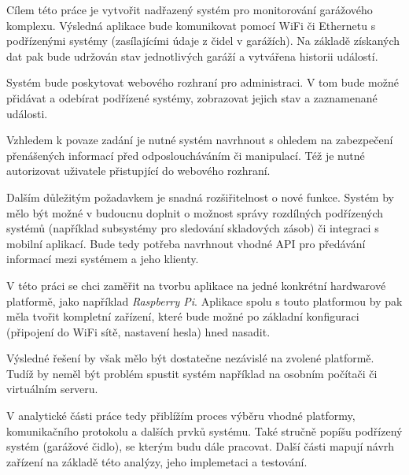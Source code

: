 Cílem této práce je vytvořit nadřazený systém pro monitorování garážového komplexu. Výsledná aplikace bude komunikovat pomocí WiFi či Ethernetu s podřízenými systémy (zasílajícími údaje z čidel v garážích). Na základě získaných dat pak bude udržován stav jednotlivých garáží a vytvářena historii událostí.

Systém bude poskytovat webového rozhraní pro administraci. V tom bude možné přidávat a odebírat podřízené systémy, zobrazovat jejich stav a zaznamenané události.

Vzhledem k povaze zadání je nutné systém navrhnout s ohledem na zabezpečení přenášených informací před odposloucháváním či manipulací. Též je nutné autorizovat uživatele přistupjící do webového rozhraní.

Dalším důležitým požadavkem je snadná rozšiřitelnost o nové funkce. Systém by mělo být možné v budoucnu doplnit o možnost správy rozdílných podřízených systémů (například subsystémy pro sledování skladových zásob) či integraci s mobilní aplikací. Bude tedy potřeba navrhnout vhodné API pro předávání informací mezi systémem a jeho klienty. 

V této práci se chci zaměřit na tvorbu aplikace na jedné konkrétní hardwarové platformě, jako například \textit{Raspberry Pi}. Aplikace spolu s touto platformou by pak měla tvořit kompletní zařízení, které bude možné po základní konfiguraci (připojení do WiFi sítě, nastavení hesla) hned nasadit.

Výsledné řešení by však mělo být dostatečne nezávislé na zvolené platformě. Tudíž by neměl být problém spustit systém například na osobním počítači či virtuálním serveru.

V analytické části práce tedy přiblížím proces výběru vhodné platformy, komunikačního protokolu a dalších prvků systému. Také stručně popíšu podřízený systém (garážové čidlo), se kterým budu dále pracovat. Další části mapují návrh zařízení na základě této analýzy, jeho implemetaci a testování.